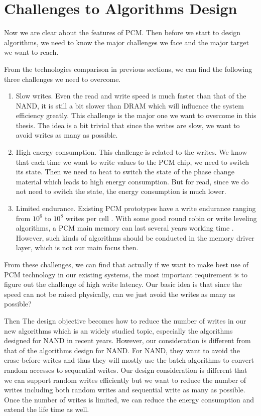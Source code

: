 \section{Challenges to Algorithms Design}

Now we are clear about the features of PCM. Then before we start to design algorithms, we need to know the major challenges we face and the major target we want to reach. 

From the technologies comparison in previous sections, we can find the following three challenges we need to overcome. 

\begin{enumerate}
  \item Slow writes. Even the read and write speed is much faster than that of the NAND, it is still a bit slower than DRAM which will influence the system efficiency greatly.
      This challenge is the major one we want to overcome in this thesis. The idea is a bit trivial that since the writes are slow, we want to avoid writes as many as possible. 
  \item High energy consumption. This challenge is related to the writes. We know that each time we want to write values to the PCM chip, we need to switch its state. Then we need to heat to switch the state of the phase change material which leads to high energy consumption. But for read, since we do not need to switch the state, the energy consumption is much lower. 
  \item Limited endurance. Existing PCM prototypes have a write endurance ranging from $10^6$ to $10^8$ writes per cell \cite{chen2011rethinking}. With some good round robin or write leveling algorithms, a PCM main memory can last several years working time \cite{qureshi2009enhancing}. However, such kinds of algorithms should be conducted in the memory driver layer, which is not our main focus then. 
\end{enumerate}

From these challenges, we can find that actually if we want to make best use of PCM technology in our existing systems, the most important requirement is to figure out the challenge of high write latency. Our basic idea is that since the speed can not be raised physically, can we just avoid the writes as many as possible? 

Then The design objective becomes how to reduce the number of writes in our new algorithms which is an widely studied topic, especially the algorithms designed for NAND in recent years. However, our consideration
is different from that of the algorithms design for NAND. For NAND, they want to avoid the erase-before-writes and thus
they will mostly use the batch algorithms to convert random accesses to sequential writes. Our design consideration is different that
we can support random writes efficiently but we want to reduce the number of writes including both random writes and sequential
write as many as possible. Once the number of writes is limited, we can reduce the energy consumption and extend the life time as well. 


